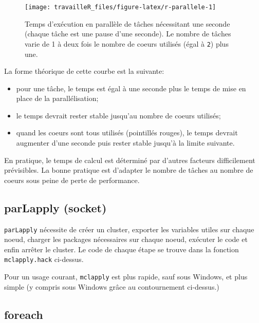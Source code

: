 \documentclass[
  12pt,
  french,
  a4paper,
  extrafontsizes,onecolumn,openright
  ]{memoir}
\providecommand{\tightlist}{%
  \setlength{\itemsep}{0pt}\setlength{\parskip}{0pt}}
\newlength{\rf}
\begin{document}
\begin{figure}

{\centering \texttt{[image: travailleR\_files/figure-latex/r-parallele-1]} 

}

\caption[Temps d'exécution en parallèle]{Temps d'exécution en parallèle de tâches nécessitant une seconde (chaque tâche est une pause d'une seconde). Le nombre de tâches varie de 1 à deux fois le nombre de coeurs utilisés (égal à \texttt{2}) plus une.}\label{fig:r-parallele}
\end{figure}

\normalsize

La forme théorique de cette courbe est la suivante:

\begin{itemize}
\tightlist
\item
  pour une tâche, le temps est égal à une seconde plus le temps de mise en place de la parallélisation;
\item
  le temps devrait rester stable jusqu'au nombre de coeurs utilisés;
\item
  quand les coeurs sont tous utilisés (pointillés rouges), le temps devrait augmenter d'une seconde puis rester stable jusqu'à la limite suivante.
\end{itemize}

En pratique, le temps de calcul est déterminé par d'autres facteurs difficilement prévisibles.
La bonne pratique est d'adapter le nombre de tâches au nombre de coeurs sous peine de perte de performance.

\hypertarget{parlapply-socket}{%
\subsection{parLapply (socket)}\label{parlapply-socket}}

\texttt{parLapply} nécessite de créer un cluster, exporter les variables utiles sur chaque noeud, charger les packages nécessaires sur chaque noeud, exécuter le code et enfin arrêter le cluster.
Le code de chaque étape se trouve dans la fonction \texttt{mclapply.hack} ci-dessus.

Pour un usage courant, \texttt{mclapply} est plus rapide, sauf sous Windows, et plus simple (y compris sous Windows grâce au contournement ci-dessus.)

\hypertarget{foreach}{%
\subsection{foreach}\label{foreach}}
\end{document}
